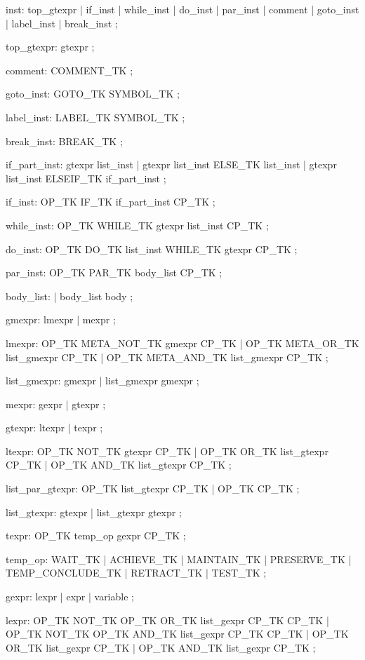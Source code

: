 inst: top_gtexpr
    | if_inst
    | while_inst
    | do_inst
    | par_inst
    | comment
    | goto_inst
    | label_inst
    | break_inst
;

top_gtexpr: gtexpr
;

comment: COMMENT_TK
;

goto_inst: GOTO_TK SYMBOL_TK
;

label_inst: LABEL_TK SYMBOL_TK
;

break_inst: BREAK_TK
;

if_part_inst: gtexpr list_inst
	| gtexpr list_inst ELSE_TK list_inst
	| gtexpr list_inst ELSEIF_TK if_part_inst
;

if_inst: OP_TK IF_TK if_part_inst CP_TK
;

while_inst: OP_TK WHILE_TK gtexpr list_inst CP_TK
;

do_inst: OP_TK DO_TK list_inst WHILE_TK gtexpr CP_TK
;

par_inst: OP_TK PAR_TK body_list CP_TK
;

body_list:
         | body_list body
;

gmexpr: lmexpr
        | mexpr
        ;

lmexpr:
        OP_TK META_NOT_TK gmexpr CP_TK
        | OP_TK  META_OR_TK list_gmexpr CP_TK
        | OP_TK META_AND_TK list_gmexpr CP_TK
        ;

list_gmexpr:
        gmexpr
        | list_gmexpr gmexpr
        ;

mexpr:
        gexpr
        | gtexpr
        ;

gtexpr:
        ltexpr
        | texpr
        ;

ltexpr:
        OP_TK NOT_TK gtexpr CP_TK
        | OP_TK OR_TK list_gtexpr CP_TK
        | OP_TK AND_TK list_gtexpr CP_TK
        ;

list_par_gtexpr:
        OP_TK list_gtexpr CP_TK
        | OP_TK CP_TK
        ;

list_gtexpr:
        gtexpr
        | list_gtexpr gtexpr
        ;

texpr:
        OP_TK temp_op gexpr CP_TK
        ;

temp_op:
          WAIT_TK
        | ACHIEVE_TK
        | MAINTAIN_TK
        | PRESERVE_TK
        | TEMP_CONCLUDE_TK
        | RETRACT_TK
        | TEST_TK
        ;

gexpr:
         lexpr
        | expr
        | variable
        ;

lexpr:
        OP_TK NOT_TK OP_TK OR_TK  list_gexpr CP_TK CP_TK
        | OP_TK  NOT_TK OP_TK AND_TK  list_gexpr CP_TK CP_TK
        | OP_TK OR_TK list_gexpr CP_TK
        | OP_TK AND_TK list_gexpr CP_TK
        ;

